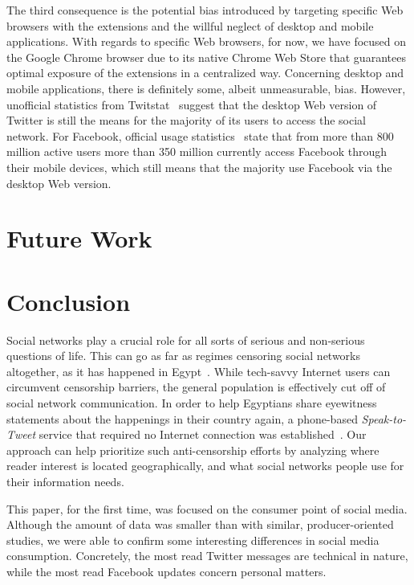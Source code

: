 \documentclass{iosart2c}
\begin{document}
The third consequence is the potential bias introduced by targeting specific Web browsers with the extensions and the willful neglect of desktop and mobile applications. 
With regards to specific Web browsers, for now, we have focused on the Google Chrome browser due to its native Chrome Web Store that guarantees optimal exposure of the extensions in a centralized way.
Concerning desktop and mobile applications, there is definitely some, albeit unmeasurable, bias.
However, unofficial statistics from Twitstat~\cite{twitstat} suggest that the desktop Web version of Twitter is still the means for the majority of its users to access the social network.
For Facebook, official usage statistics~\cite{facebookstats} state that from more than 800 million active users more than 350 million currently access Facebook through their mobile devices, which still means that the majority use Facebook via the desktop Web version.

\section{Future Work} \label{sec:futurework}


\section{Conclusion} \label{sec:conclusion}
Social networks play a crucial role for all sorts of serious and non-serious questions of life.
This can go as far as regimes censoring social networks altogether, as it has happened in Egypt~\cite{censor}.
While tech-savvy Internet users can circumvent censorship barriers, the general population is effectively cut off of social network communication.
In order to help Egyptians share eyewitness statements about the happenings in their country again, a phone-based \emph{Speak-to-Tweet} service that required no Internet connection was established~\cite{egypt}.
Our approach can help prioritize such anti-censorship efforts by analyzing where reader interest is located geographically, and what social networks people use for their information needs.

This paper, for the first time, was focused on the consumer point of social media.
Although the amount of data was smaller than with similar, producer-oriented studies, we were able to confirm some interesting differences in social media consumption.
Concretely, the most read Twitter messages are technical in nature, while the most read Facebook updates concern personal matters.
\end{document}
